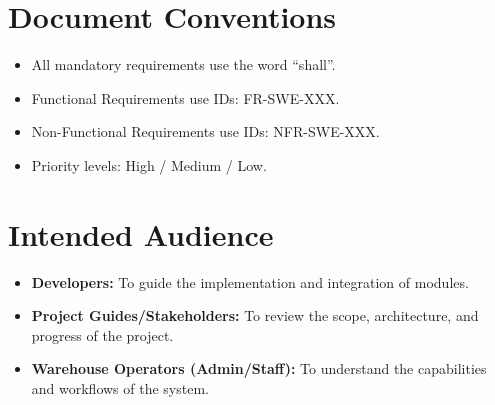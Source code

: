 \documentclass[12pt,a4paper]{report}
\begin{document}
\section{Document Conventions}
\begin{itemize}
    \item All mandatory requirements use the word ``shall''.
    \item Functional Requirements use IDs: FR-SWE-XXX.
    \item Non-Functional Requirements use IDs: NFR-SWE-XXX.
    \item Priority levels: High / Medium / Low.
\end{itemize}

\section{Intended Audience}
\begin{itemize}
    \item \textbf{Developers:} To guide the implementation and integration of modules.
    \item \textbf{Project Guides/Stakeholders:} To review the scope, architecture, and progress of the project.
    \item \textbf{Warehouse Operators (Admin/Staff):} To understand the capabilities and workflows of the system.
\end{itemize}
\end{document}
